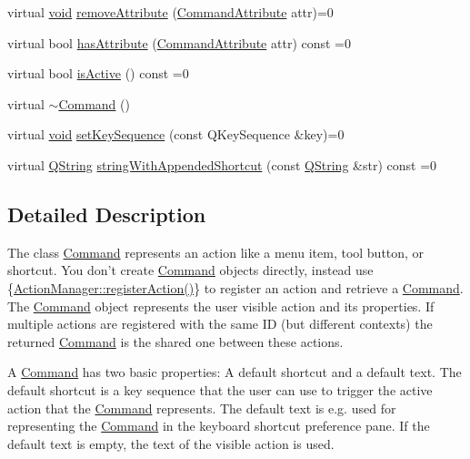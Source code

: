 \begin{DoxyCompactItemize}
\item 
virtual \hyperlink{group___u_a_v_objects_plugin_ga444cf2ff3f0ecbe028adce838d373f5c}{void} \hyperlink{group___core_plugin_ga8d243f6cf311114107abfeea80a99ad0}{remove\-Attribute} (\hyperlink{group___core_plugin_ga4d899c1f711159a432afeab3eb78c917}{\-Command\-Attribute} attr)=0
\item 
virtual bool \hyperlink{group___core_plugin_ga534d642231f8e08b2641744553f42def}{has\-Attribute} (\hyperlink{group___core_plugin_ga4d899c1f711159a432afeab3eb78c917}{\-Command\-Attribute} attr) const =0
\item 
virtual bool \hyperlink{group___core_plugin_ga1bd3d8bc9629dfcc6fc495a61b279a7c}{is\-Active} () const =0
\item 
virtual \hyperlink{group___core_plugin_gab552bb3a07fdd1acbfd8ea76e69b2278}{$\sim$\-Command} ()
\item 
virtual \hyperlink{group___u_a_v_objects_plugin_ga444cf2ff3f0ecbe028adce838d373f5c}{void} \hyperlink{group___core_plugin_gad53cfa78788d0ccaeb168c512bb2c48a}{set\-Key\-Sequence} (const \-Q\-Key\-Sequence \&key)=0
\item 
virtual \hyperlink{group___u_a_v_objects_plugin_gab9d252f49c333c94a72f97ce3105a32d}{\-Q\-String} \hyperlink{group___core_plugin_gaf1df828641589d3db881d84c471abb3f}{string\-With\-Appended\-Shortcut} (const \hyperlink{group___u_a_v_objects_plugin_gab9d252f49c333c94a72f97ce3105a32d}{\-Q\-String} \&str) const =0
\end{DoxyCompactItemize}


\subsection{\-Detailed \-Description}
\-The class \hyperlink{class_core_1_1_command}{\-Command} represents an action like a menu item, tool button, or shortcut. \-You don't create \hyperlink{class_core_1_1_command}{\-Command} objects directly, instead use \{\hyperlink{group___core_plugin_ga316dd0cff29b294cd1b0631677f6357d}{\-Action\-Manager\-::register\-Action()}\} to register an action and retrieve a \hyperlink{class_core_1_1_command}{\-Command}. \-The \hyperlink{class_core_1_1_command}{\-Command} object represents the user visible action and its properties. \-If multiple actions are registered with the same \-I\-D (but different contexts) the returned \hyperlink{class_core_1_1_command}{\-Command} is the shared one between these actions. 

\-A \hyperlink{class_core_1_1_command}{\-Command} has two basic properties\-: \-A default shortcut and a default text. \-The default shortcut is a key sequence that the user can use to trigger the active action that the \hyperlink{class_core_1_1_command}{\-Command} represents. \-The default text is e.\-g. used for representing the \hyperlink{class_core_1_1_command}{\-Command} in the keyboard shortcut preference pane. \-If the default text is empty, the text of the visible action is used.

